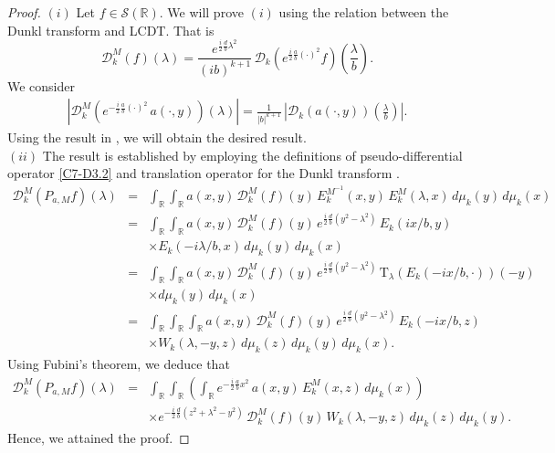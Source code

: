 \documentclass[12pt,a4paper,reqno]{amsproc}
\theoremstyle{definition}
\theoremstyle{remark}
\numberwithin{equation}{section}
\newcommand{\Tau}{\mathrm{T}}
\begin{document}
\begin{proof}
$(i)$ Let $f\in\mathcal{S}(\mathbb{R})$. We will prove $(i)$ using the relation between the Dunkl transform and LCDT. That is
\begin{equation*}
\mathcal{D}_k^M(f)(\lambda) = \frac{ e^{\frac{i}{2}\frac{d}{b}\lambda^2}}{(ib)^{k+1}}\,\mathcal{D}_k(e^{\frac{i}{2}\frac{a}{b}(\cdot)^2}f)\left(\frac{\lambda}{b}\right).
\end{equation*}
We consider
\begin{eqnarray*}
\left|\mathcal{D}_k^M\left(e^{-\frac{i}{2}\frac{a}{b}(\cdot)^2}\,a(\cdot,y)\right)(\lambda) \right| = \frac{1}{|b|^{k+1}}\, \left|\mathcal{D}_k(a(\cdot,y))\left(\frac{\lambda}{b}\right)\right|.
\end{eqnarray*}
Using the result in  \cite[Proposition 5.1]{Dachraoui}, we will obtain the desired result.\\
$(ii)$ The result is established by employing the definitions of pseudo-differential operator \ref{C7-D3.2} and translation operator for the Dunkl transform \cite{USK}.
\begin{eqnarray*}
\mathcal{D}_k^M(P_{a,M}f)(\lambda) &=& \int_{\mathbb{R}}\int_{\mathbb{R}}a(x,y)\,\mathcal{D}_k^M(f)(y)\,E_k^{M^{-1}}(x,y)\,E_k^M(\lambda,x)\,d\mu_k(y)\,d\mu_k(x)\\
&=&\int_{\mathbb{R}}\int_{\mathbb{R}}a(x,y)\,\mathcal{D}_k^M(f)(y)\,e^{\frac{i}{2}\frac{d}{b}(y^2-\lambda^2)}\,E_k(ix/b,y)\\
&&\times E_k(-i\lambda/b,x)\,d\mu_k(y)\,d\mu_k(x)
\\
&=& \int_{\mathbb{R}}\int_{\mathbb{R}}a(x,y)\,\mathcal{D}_k^M(f)(y)\,e^{\frac{i}{2}\frac{d}{b}(y^2-\lambda^2)}\,\Tau_{\lambda}(E_k(-ix/b,\cdot))(-y)
\\
&&\times d\mu_k(y)\,d\mu_k(x)
\\
&=& \int_{\mathbb{R}}\int_{\mathbb{R}}\int_{\mathbb{R}}a(x,y)\,\mathcal{D}_k^M(f)(y)\,e^{\frac{i}{2}\frac{d}{b}(y^2-\lambda^2)}\,E_k(-ix/b,z)\\
&& \times W_k(\lambda,-y,z)\,d\mu_k(z)\,d\mu_k(y)\,d\mu_k(x).
\end{eqnarray*}
Using Fubini's theorem, we deduce that
\begin{eqnarray*}
\mathcal{D}_k^M(P_{a,M}f)(\lambda) &=&\int_{\mathbb{R}}\int_{\mathbb{R}} \left( \int_{\mathbb{R}}e^{-\frac{i}{2}\frac{a}{b}x^2}\,a(x,y)\,E_k^M(x,z)\,d\mu_k(x)\right)\\
&&\times e^{-\frac{i}{2}\frac{d}{b}(z^2+\lambda^2-y^2)}\,\mathcal{D}_k^M(f)(y)\,W_k(\lambda,-y,z)\,d\mu_k(z)\,d\mu_k(y).
\end{eqnarray*}
Hence, we attained the proof.
\end{proof}
\end{document}
